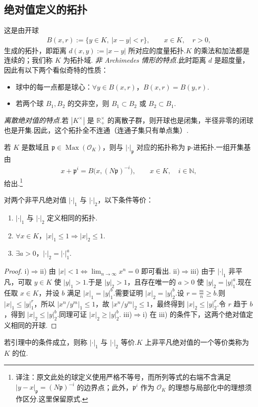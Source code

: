 \subsection{绝对值定义的拓扑}\label{sec:nt-4-1-2}
这是由开球
\begin{align*}
B(x,r):=\{y\in K,\ |x-y|<r\},\qquad x\in K,\quad r>0,
\end{align*}
生成的拓扑，即距离 $d(x,y):=|x-y|$ 所对应的度量拓扑.$K$ 的乘法和加法都是连续的；我们称 $K$ 为拓扑域.
\emph{非 Archimedes 情形的特点.}此时距离 $d$ 是超度量，因此有以下两个看似奇特的性质：
\begin{itemize}
\item 球中的每一点都是球心：$\forall y\in B(x,r)$，$B(x,r)=B(y,r)$.
\item 若两个球 $B_1,B_2$ 的交非空，则 $B_1\subset B_2$ 或 $B_2\subset B_1$.
\end{itemize}
\emph{离散绝对值的特点.}若 $|K^\times|$ 是 $\mathbb R_+^\times$ 的离散子群，则开球也是闭集，半径非零的闭球也是开集.因此，这个拓扑全不连通（连通子集只有单点集）.
\begin{example*}
若 $K$ 是数域且 $\mathfrak p\in\operatorname{Max}(\mathcal O_K)$，则与 $|\cdot|_{\mathfrak p}$ 对应的拓扑称为 $\mathfrak p$-进拓扑.一组开集基由
\begin{align*}
x+\mathfrak p^i=B\bigl(x,(N\mathfrak p)^{-i}\bigr),\qquad x\in K,\quad i\in\mathbb N,
\end{align*}
给出.\footnote{译注：原文此处的球定义使用严格不等号，而所列等式的右端不含满足 $|y-x|_{\mathfrak p}=(N\mathfrak p)^{-i}$ 的边界点；此外，$\mathfrak p^i$ 作为 $\mathcal O_K$ 的理想与局部化中的理想须作区分.这里保留原式.}
\end{example*}
\begin{lemma*}
对两个非平凡绝对值 $|\cdot|_1$ 与 $|\cdot|_2$，以下条件等价：
\begin{enumerate}[label=\roman*)]
\item $|\cdot|_1$ 与 $|\cdot|_2$ 定义相同的拓扑.
\item $\forall x\in K$，$|x|_1\le1\Rightarrow |x|_2\le1$.
\item $\exists a>0$，$|\cdot|_2=|\cdot|_1^a$.
\end{enumerate}
\end{lemma*}
\begin{proof}
\textup{i)$\Rightarrow$ii)} 由 $|x|<1\Longleftrightarrow\lim_{n\to\infty}x^n=0$ 即可看出.
\textup{ii)$\Rightarrow$iii)} 由于 $|\cdot|_1$ 非平凡，可取 $y\in K$ 使 $|y|_1>1$.于是 $|y|_2>1$，且存在唯一的 $a>0$ 使 $|y|_2=|y|_1^a$.现在任取 $x\in K$，并设 $b$ 满足 $|x|_1=|y|_1^b$.需要证明 $|x|_2=|y|_2^b$.设 $r=\frac mn\ge b$.则 $|x|_1\le|y|_1^r$，所以 $|x^n/y^m|_1\le1$，故 $|x^n/y^m|_2\le1$，最终得到 $|x|_2\le|y|_2^r$.令 $r$ 趋于 $b$，得到 $|x|_2\le|y|_2^b$.同理可证 $|x|_2\ge|y|_2^b$.
\textup{iii)$\Rightarrow$i)} 在 iii) 的条件下，这两个绝对值定义相同的开球.
\end{proof}
\begin{definition*}
若引理中的条件成立，则称 $|\cdot|_1$ 与 $|\cdot|_2$ 等价.$K$ 上非平凡绝对值的一个等价类称为 $K$ 的位.
\end{definition*}
